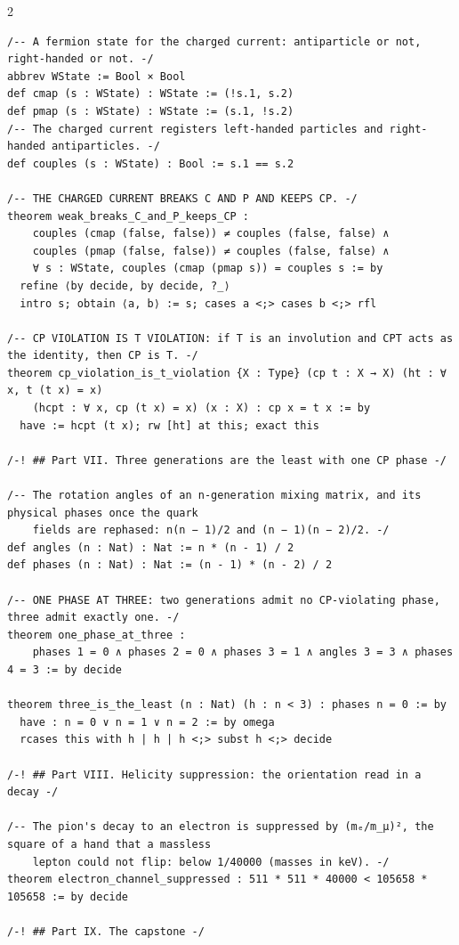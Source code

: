 \documentclass[10pt]{article}
\begin{document}
\begin{multicols}{2}
\begin{Verbatim}[fontsize=\fontsize{6.2}{7.2}\selectfont,breaklines,breakanywhere,breaksymbolleft={}]
/-- A fermion state for the charged current: antiparticle or not, right-handed or not. -/
abbrev WState := Bool × Bool
def cmap (s : WState) : WState := (!s.1, s.2)
def pmap (s : WState) : WState := (s.1, !s.2)
/-- The charged current registers left-handed particles and right-handed antiparticles. -/
def couples (s : WState) : Bool := s.1 == s.2

/-- THE CHARGED CURRENT BREAKS C AND P AND KEEPS CP. -/
theorem weak_breaks_C_and_P_keeps_CP :
    couples (cmap (false, false)) ≠ couples (false, false) ∧
    couples (pmap (false, false)) ≠ couples (false, false) ∧
    ∀ s : WState, couples (cmap (pmap s)) = couples s := by
  refine ⟨by decide, by decide, ?_⟩
  intro s; obtain ⟨a, b⟩ := s; cases a <;> cases b <;> rfl

/-- CP VIOLATION IS T VIOLATION: if T is an involution and CPT acts as the identity, then CP is T. -/
theorem cp_violation_is_t_violation {X : Type} (cp t : X → X) (ht : ∀ x, t (t x) = x)
    (hcpt : ∀ x, cp (t x) = x) (x : X) : cp x = t x := by
  have := hcpt (t x); rw [ht] at this; exact this

/-! ## Part VII. Three generations are the least with one CP phase -/

/-- The rotation angles of an n-generation mixing matrix, and its physical phases once the quark
    fields are rephased: n(n − 1)/2 and (n − 1)(n − 2)/2. -/
def angles (n : Nat) : Nat := n * (n - 1) / 2
def phases (n : Nat) : Nat := (n - 1) * (n - 2) / 2

/-- ONE PHASE AT THREE: two generations admit no CP-violating phase, three admit exactly one. -/
theorem one_phase_at_three :
    phases 1 = 0 ∧ phases 2 = 0 ∧ phases 3 = 1 ∧ angles 3 = 3 ∧ phases 4 = 3 := by decide

theorem three_is_the_least (n : Nat) (h : n < 3) : phases n = 0 := by
  have : n = 0 ∨ n = 1 ∨ n = 2 := by omega
  rcases this with h | h | h <;> subst h <;> decide

/-! ## Part VIII. Helicity suppression: the orientation read in a decay -/

/-- The pion's decay to an electron is suppressed by (mₑ/m_μ)², the square of a hand that a massless
    lepton could not flip: below 1/40000 (masses in keV). -/
theorem electron_channel_suppressed : 511 * 511 * 40000 < 105658 * 105658 := by decide

/-! ## Part IX. The capstone -/


\end{Verbatim}
\end{multicols}
\end{document}

